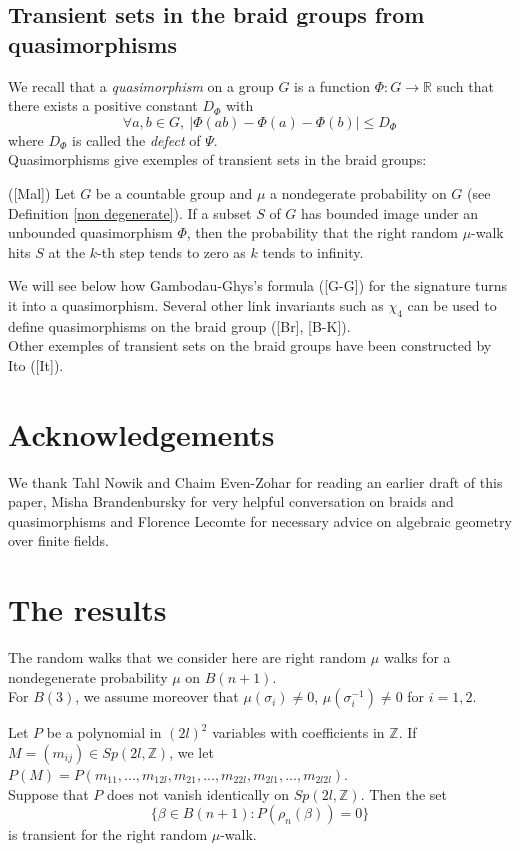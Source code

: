 \documentclass[12pt]{article}
\begin{document}
\subsection{Transient sets in the braid groups from quasimorphisms}
 We recall that 
a {\it quasimorphism} on a group $G$ is a function $\Phi:G\longrightarrow \mathbb{R}$ such that there exists a positive constant $D_\Phi$ with
\begin{equation}\label{quasimorphisme}
\forall a,b\in G,\ |\Phi(ab)-\Phi(a)-\Phi(b)|\leq D_\Phi
\end{equation}
where $D_\Phi$ is called the {\it defect} of $\Psi$.\\
Quasimorphisms give exemples of transient sets in the braid groups:
\begin{thm}\label{malyutin}
	([Mal]) Let $G$ be a countable group and $\mu$ a nondegerate probability on $G$ (see Definition \ref{non degenerate}). If  a subset $S$ of $G$ has bounded image under an unbounded quasimorphism $\Phi$, then the probability that the right random $\mu$-walk hits $S$ at the $k$-th step tends to zero as $k$ tends to infinity.
\end{thm}
We will see below how Gambodau-Ghys's formula ([G-G]) for the signature turns it into a quasimorphism.  Several other link invariants such as $\chi_4$ can be used to define   quasimorphisms on the braid group ([Br], [B-K]).\\
Other exemples of transient sets on the braid groups have been constructed by Ito ([It]).

\section*{Acknowledgements}
We thank Tahl Nowik and Chaim Even-Zohar for reading an earlier draft of this paper, Misha Brandenbursky for very helpful conversation on braids and quasimorphisms and Florence Lecomte for necessary advice on algebraic geometry over finite fields. 


\section{The results}
\begin{ass}\label{assump}  The random walks that we consider here are right random $\mu$ walks for a nondegenerate probability $\mu$ on $B(n+1)$. \\
For $B(3)$, we assume moreover that $\mu(\sigma_i)\neq 0$, $\mu(\sigma_i^{-1})\neq 0$ for $i=1,2$.
\end{ass}
\begin{thm}\label{prop sur les transients}
	Let $P$ be a polynomial in $(2l)^2$ variables with coefficients in $\mathbb{Z}$. If $M=(m_{ij})\in Sp(2l,\mathbb{Z})$, we let 
	$P(M)=P(m_{11},...,m_{12l},m_{21},...,m_{22l},m_{2l1},...,m_{2l2l}).$\\
	Suppose that $P$ does not vanish identically on $Sp(2l,\mathbb{Z})$. Then the set
	$$\{\beta\in B(n+1): P(\rho_n(\beta))=0\}$$
	is transient for the right random $\mu$-walk.
\end{thm}
\end{document}
